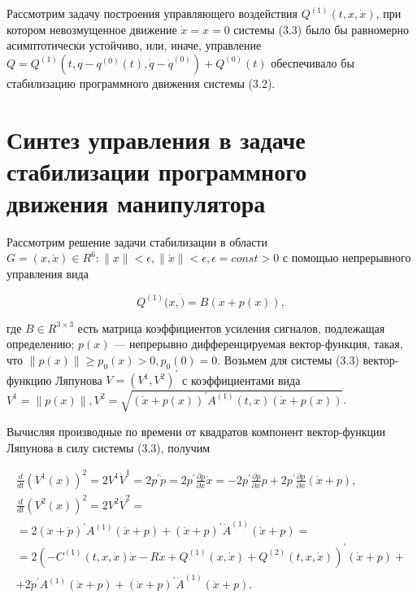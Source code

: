  Рассмотрим задачу построения управляющего воздействия $Q^{(1)}(t, x, \dot x)$, при котором невозмущенное движение $\dot x = x = 0$ системы (3.3) было бы равномерно асимптотически устойчиво, или, иначе, управление $Q = Q^{(1)}(t, q-q^{(0)}(t), \dot q - \dot q^{(0)}) + Q^{(0)}(t)$ обеспечивало бы стабилизацию программного движения   системы (3.2).
 
  \section{Синтез управления в задаче стабилизации программного движения манипулятора}%
 Рассмотрим решение задачи стабилизации в области $G = {(x, \dot x) \in R^6 : \|x\| < \epsilon, \|\dot x \| < \epsilon, \epsilon = const>0}$
 с помощью непрерывного управления вида
 
 \begin{equation*}
  Q^{(1)} (x, \dot ) = B(\dot x + p(x)),
 \end{equation*}
 
 где $B \in R^{3 \times 3}$ есть матрица коэффициентов усиления сигналов, подлежащая определению; $p(x)$ --- непрерывно дифференцируемая вектор-функция, такая, что $\| p(x) \| \ge p_0(x) > 0, p_0(0) = 0$.
 Возьмем для системы (3.3) вектор-функцию Ляпунова $V = (V^1, V^2)^{'}$ с коэффициентами вида $V^1 = \|p(x)\|, V^2 = \sqrt{(\dot x + p(x))^{'} A^{(1)} (t, x) (\dot x + p(x))}$.
 
 Вычисляя производные по времени от квадратов компонент вектор-функции Ляпунова  в силу системы (3.3), получим 
 
 \begin{equation*}
 \begin{array}{c}
 \displaystyle \frac{d}{dt} (V^1(x))^2 = 2 V^1 \dot V^1 = 2 p^{'} \dot p = 2 p^{'} \frac{\partial p }{\partial x} \dot x = -2 p^{'} \frac{\partial p }{\partial x} p + 2 p^{'} \frac{\partial p }{\partial x}(\dot x + p),\\
    \displaystyle \frac{d}{dt} (V^2(x))^2 = 2 V^2 \dot V^2 =\\
   \displaystyle = 2(\ddot x + \dot p)^{'} A^{(1)} (\dot x + p) + (\dot x + p)^{'} \dot A^{(1)} (\dot x + p) =\\
   \displaystyle = 2(- C^{(1)}(t, x, \dot x) \dot x - R \dot x + Q^{(1)}(x, \dot x) + Q^{(2)}(t, x, \dot x))^{'} (\dot x + p) +\\
   \displaystyle + 2 \dot p^{'} A^{(1)} (\dot x + p) + (\dot x + p)^{'} \dot A^{(1)} (\dot x + p).
 \end{array}
 \end{equation*}
 
